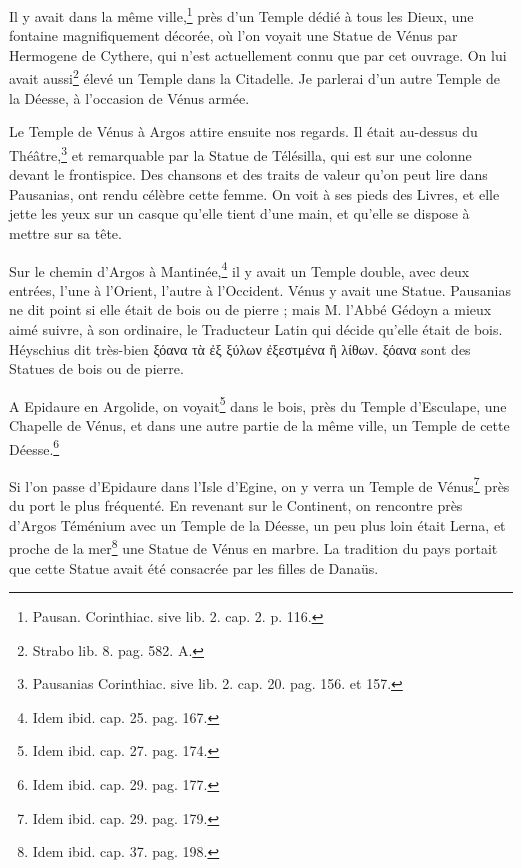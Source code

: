 \documentclass[a4paper, 18pt, oneside]{article}
\begin{document}
Il y avait dans la même ville,\footnote{Pausan. Corinthiac. sive lib. 2. cap. 2. p. 116.} près d'un Temple dédié à tous les Dieux, une fontaine magnifiquement décorée, où l'on voyait une Statue de Vénus par Hermogene de Cythere, qui n'est actuellement connu que par cet ouvrage. On lui avait aussi\footnote{Strabo lib. 8. pag. 582. A.} élevé un Temple dans la Citadelle. Je parlerai d'un autre Temple de la Déesse, à l'occasion de Vénus armée.

Le Temple de Vénus à Argos attire ensuite nos regards. Il était au-dessus du Théâtre,\footnote{Pausanias Corinthiac. sive lib. 2. cap. 20. pag. 156. et 157.} et remarquable par la Statue de Télésilla, qui est sur une colonne devant le frontispice. Des chansons et des traits de valeur qu'on peut lire dans Pausanias, ont rendu célèbre cette femme. On voit à ses pieds des Livres, et elle jette les yeux sur un casque qu'elle tient d'une main, et qu'elle se dispose à mettre sur sa tête.

Sur le chemin d'Argos à Mantinée,\footnote{Idem ibid. cap. 25. pag. 167.} il y avait un Temple double, avec deux entrées, l'une à l'Orient, l'autre à l'Occident. Vénus y avait une Statue. Pausanias ne dit point si elle était de bois ou de pierre ; mais M. l'Abbé Gédoyn a mieux aimé suivre, à son ordinaire, le Traducteur Latin qui décide qu'elle était de bois. Héyschius dit très-bien ξόανα τὰ ἐξ ξύλων ἐξεστμένα ἢ λίθων. ξόανα sont des Statues de bois ou de pierre.

A Epidaure en Argolide, on voyait\footnote{Idem ibid. cap. 27. pag. 174.} dans le bois, près du Temple d'Esculape, une Chapelle de Vénus, et dans une autre partie de la même ville, un Temple de cette Déesse.\footnote{Idem ibid. cap. 29. pag. 177.}

Si l'on passe d'Epidaure dans l'Isle d'Egine, on y verra un Temple de Vénus\footnote{Idem ibid. cap. 29. pag. 179.} près du port le plus fréquenté. En revenant sur le Continent, on rencontre près d'Argos Téménium avec un Temple de la Déesse, un peu plus loin était Lerna, et proche de la mer\footnote{Idem ibid. cap. 37. pag. 198.} une Statue de Vénus en marbre. La tradition du pays portait que cette Statue avait été consacrée par les filles de Danaüs.
\end{document}
